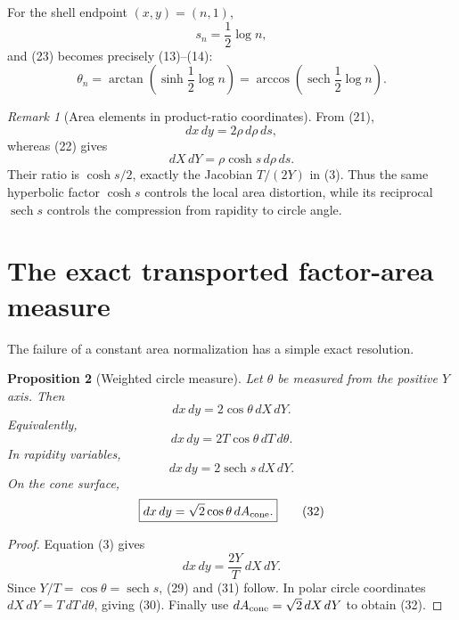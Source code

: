 \documentclass[11pt]{amsart}
\newtheorem{proposition}{Proposition}
\theoremstyle{remark}
\newtheorem{remark}[proposition]{Remark}
\begin{document}
For the shell endpoint $(x,y)=(n,1)$,
\begin{equation}
s_n=\frac12\log n, \tag{27}
\end{equation}
and (23) becomes precisely (13)--(14):
\begin{equation}
\boxed{
\theta_n
=\arctan\!\left(\sinh\frac12\log n\right)
=\arccos\!\left(\operatorname{sech}\frac12\log n\right).}
\tag{28}
\end{equation}

\begin{remark}[Area elements in product-ratio coordinates]
From (21),
\[
dx\,dy=2\rho\,d\rho\,ds,
\]
whereas (22) gives
\[
dX\,dY=\rho\cosh s\,d\rho\,ds.
\]
Their ratio is $\cosh s/2$, exactly the Jacobian $T/(2Y)$ in (3). Thus the same hyperbolic factor $\cosh s$ controls the local area distortion, while its reciprocal $\operatorname{sech}s$ controls the compression from rapidity to circle angle.
\end{remark}

\section{The exact transported factor-area measure}
The failure of a constant area normalization has a simple exact resolution.

\begin{proposition}[Weighted circle measure]\label{prop:weightedmeasure}
Let $\theta$ be measured from the positive $Y$ axis. Then
\begin{equation}
\boxed{dx\,dy=2\cos\theta\,dX\,dY.}\tag{29}
\end{equation}
Equivalently,
\begin{equation}
\boxed{dx\,dy=2T\cos\theta\,dT\,d\theta.}\tag{30}
\end{equation}
In rapidity variables,
\begin{equation}
\boxed{dx\,dy=2\operatorname{sech}s\,dX\,dY.}\tag{31}
\end{equation}
On the cone surface,
\begin{equation}
\boxed{dx\,dy=\sqrt2\cos\theta\,dA_{\rm cone}.}\tag{32}
\end{equation}
\end{proposition}

\begin{proof}
Equation (3) gives
\[
dx\,dy=\frac{2Y}{T}\,dX\,dY.
\]
Since $Y/T=\cos\theta=\operatorname{sech}s$, (29) and (31) follow. In polar circle coordinates $dX\,dY=T\,dT\,d\theta$, giving (30). Finally use $dA_{\rm cone}=\sqrt2\,dX\,dY$ to obtain (32).
\end{proof}
\end{document}
